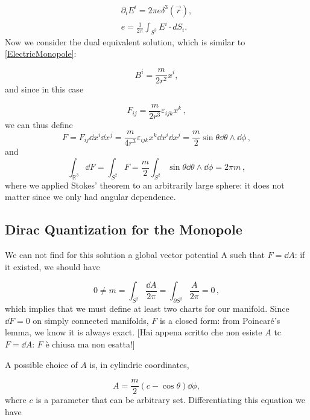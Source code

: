 \begin{align}
\partial_i E^i=2\pi e \delta^3(\vec r),\\
e=\frac{1}{2\pi}\int_{S^2} E^i \cdot d S_i.
\end{align}
Now we consider the dual equivalent solution, which is similar to \eqref{ElectricMonopole}:

\begin{equation}\label{MagneticMonopole}
B^i=\frac{m}{2r^2}x^i,
\end{equation}
and since in this case

\begin{equation}
F_{ij}=\frac{m}{2r^3}\varepsilon_{ijk}x^k\,,
\end{equation}
%
we can thus define
%
\begin{equation}
F=F_{ij}\dd{x^i}\dd{x^j}=\frac{m}{4r^3}\varepsilon_{ijk}x^k\dd{x^i}\dd{x^j}=\frac{m}{2}\sin\theta \dd{\theta}\wedge \dd{\phi}\,,
\end{equation}
%
and
%
\begin{equation}
\int_{\mathbb R^3} \dd{F} = \int_{S^2} F=\frac{m}{2}\int_{S^2}\sin\theta \dd{\theta}\wedge \dd{\phi}=2\pi m\,,
\end{equation}
%
where we applied Stokes' theorem to an arbitrarily large sphere: it does not matter since we only had angular dependence.
\subsection{Dirac Quantization for the Monopole}
We can not find for this solution a global vector potential A such that $F=\dd{A}$: if it existed, we should have

\begin{equation}
0\neq m=\int_{S^2}\frac{\dd{A}}{2\pi}=\int_{\partial S^2}\frac{A}{2\pi}=0\,,
\end{equation}
%
which implies that we must define at least two charts for our manifold.
Since $\dd{F}=0$ on simply connected manifolds, $F$ is a closed form: from Poincaré's lemma, we know it is always exact. [Hai appena scritto che non esiste $A$ tc $F = \dd{A}$: $F$ è chiusa ma non esatta!]

A possible choice of $A$ is, in cylindric coordinates,

\begin{equation}
A=\frac{m}{2}\left(c-\cos\theta\right)\dd{\phi},
\end{equation}
where $c$ is a parameter that can be arbitrary set. Differentiating this equation we have

